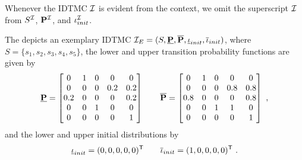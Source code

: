 Whenever the IDTMC $\mathcal{I}$ is evident from the context, we omit the superscript $\mathcal{I}$ from $S^{\mathcal{I}}$, $\mathbf{P}^{\mathcal{I}}$, and $\iota_{init}^{\mathcal{I}}$. 

\begin{example}\label{ex:IMC_for_semantic}
    The  depicts an exemplary IDTMC $\mathcal{I}_E = (S,\mathbf{\underline{P}},\mathbf{\overline{P}},\mathbf{\underline{\iota}}_{init},\mathbf{\overline{\iota}}_{init})$, where $S = \{s_1,s_2,s_3,s_4,s_5\}$, the lower and upper transition probability functions are given by  
    \[
        \mathbf{\underline{P}} =
        \begin{bmatrix}
            0 & 1 & 0 & 0 & 0 \\
            0 & 0 & 0 & 0.2 & 0.2 \\
            0.2 & 0 & 0 & 0 & 0.2 \\
            0 & 0 & 1 & 0 & 0 \\
            0 & 0 & 0 & 0 & 1
        \end{bmatrix}
        \qquad
        \mathbf{\overline{P}} =
        \begin{bmatrix}
            0 & 1 & 0 & 0 & 0 \\
            0 & 0 & 0 & 0.8 & 0.8 \\
            0.8 & 0 & 0 & 0 & 0.8 \\
            0 & 0 & 1 & 1 & 0 \\
            0 & 0 & 0 & 0 & 1
        \end{bmatrix}\ ,
    \]
    and the lower and upper initial distributions by
    \[\mathbf{\underline{\iota}}_{init} = (0,0,0,0,0)^{\mathsf{T}} \qquad \mathbf{\overline{\iota}}_{init} = (1,0,0,0,0)^{\mathsf{T}} \ .\]
    
\end{example}

